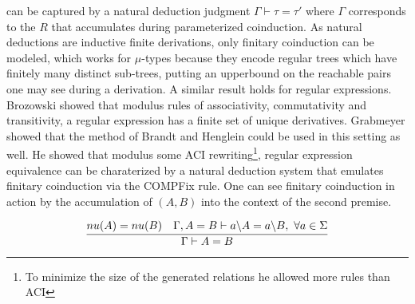 \documentclass[a4paper,UKenglish,cleveref, autoref, thm-restate]{lipics-v2021}
\begin{document}
can be captured by a natural deduction judgment $\Gamma \vdash \tau = \tau' $ where $\Gamma$ corresponds to the $R$ that accumulates during parameterized coinduction. As natural deductions are inductive finite derivations, only finitary coinduction can be modeled, which works for $\mu$-types because they encode regular trees which have finitely many distinct sub-trees, putting an upperbound on the reachable pairs one may see during a derivation. A similar result holds for regular expressions.\\
 Brozowski showed that modulus rules of associativity, commutativity and transitivity, a regular expression has a finite set of unique derivatives. Grabmeyer showed that the method of Brandt and Henglein could be used in this setting as well. He showed that modulus some ACI rewriting\footnote{To minimize the size of the generated relations he allowed more rules than ACI}, regular expression equivalence can be charaterized by a natural deduction system that emulates finitary coinduction via the COMPFix rule. One can see finitary coinduction in action by the accumulation of $(A,B)$ into the context of the second premise.
\begin{definition}
\[\infer{\Gamma \vdash A =  B}{\mynu{A} =  \mynu{B} & \Gamma, A = B \vdash \derive{a}{A} = \derive{a}{B},~\forall a \in \Sigma}\] 
\end{definition}
\end{document}
